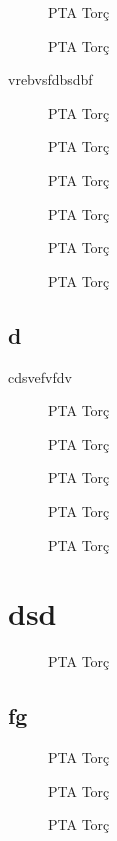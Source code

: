 \begin{figure}
\caption{PTA Torç}\label{fig:PtaTorc}
\end{figure}

\begin{figure}
\caption{PTA Torç}\label{fig:PtaTorc}
\end{figure}
vrebvsfdbsdbf

\begin{figure}
\caption{PTA Torç}\label{fig:PtaTorc}
\end{figure}

\begin{figure}
\caption{PTA Torç}\label{fig:PtaTorc}
\end{figure}
\cleardoublepage

\begin{figure}
\caption{PTA Torç}\label{fig:PtaTorc}
\end{figure}
\begin{figure}[h]
\caption{PTA Torç}\label{fig:PtaTorc}
\end{figure}
\begin{figure}[h]
\caption{PTA Torç}\label{fig:PtaTorc}
\end{figure}
\begin{figure}[h]
\caption{PTA Torç}\label{fig:PtaTorc}
\end{figure}
\section{d}

cdsvefvfdv
\begin{figure}[h]
\caption{PTA Torç}\label{fig:PtaTorc}
\end{figure}
\begin{figure}[h]
\caption{PTA Torç}\label{fig:PtaTorc}
\end{figure}
\begin{figure}[h]
\caption{PTA Torç}\label{fig:PtaTorc}
\end{figure}
\begin{figure}[h]
\caption{PTA Torç}\label{fig:PtaTorc}
\end{figure}
\begin{figure}[h]
\caption{PTA Torç}\label{fig:PtaTorc}
\end{figure}
\chapter{dsd}
\begin{figure}[h]
\caption{PTA Torç}\label{fig:PtaTorc}
\end{figure}
\section{fg}
\begin{figure}[h]
\caption{PTA Torç}\label{fig:PtaTorc}
\end{figure}
\begin{figure}[h]
\caption{PTA Torç}\label{fig:PtaTorc}
\end{figure}

\begin{figure}[h]
\caption{PTA Torç}\label{fig:PtaTorc}
\end{figure}